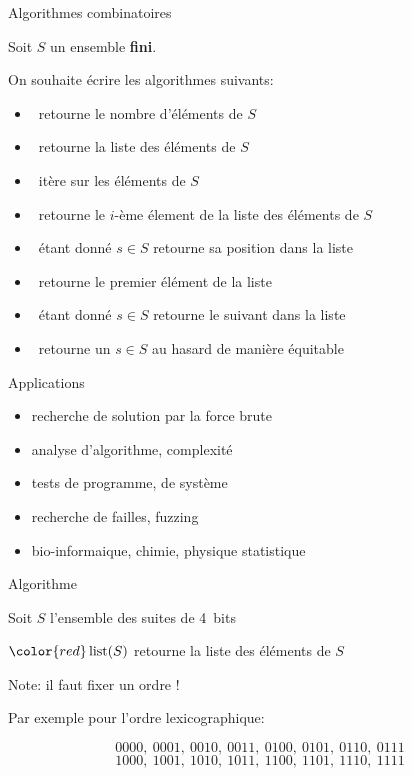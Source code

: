 \documentclass{beamer}
\def\red{\color{red}}
\begin{document}
\begin{frame}{Algorithmes combinatoires}

   Soit $S$ un ensemble \textbf{fini}.

   On souhaite écrire les algorithmes suivants: \bigskip

\begin{itemize}
\item \Count\ retourne le nombre d'éléments de $S$
\item \List\ retourne la liste des éléments de $S$
\item \Iter\ itère sur les éléments de $S$
\item \Unrank\ retourne le $i$-ème élement de la liste des éléments de $S$
\item \Rank\ étant donné $s\in S$ retourne sa position dans la liste
\item \First\ retourne le premier élément de la liste
\item \Next\ étant donné $s\in S$ retourne le suivant dans la liste
\item \Random\ retourne un $s\in S$ au hasard de manière équitable
\end{itemize}
\end{frame}

\begin{frame}{Applications}

  \begin{itemize}
  \item recherche de solution par la force brute
    \bigskip

  \item analyse d'algorithme, complexité
    \bigskip

  \item tests de programme, de système
    \bigskip

  \item recherche de failles, fuzzing
    \bigskip

  \item bio-informaique, chimie, physique statistique
  \end{itemize}
\end{frame}

\begin{frame}{Algorithme \List}

Soit $S$ l'ensemble des suites de 4~bits
\medskip

\begin{ALGO}[{{\red\List}}]
${\red\List(S)}$ retourne la liste des éléments de $S$
\end{ALGO}
\medskip\pause

Note: il faut fixer un ordre !
\medskip\pause

Par exemple pour l'ordre lexicographique:

\[ 0000,\ 0001,\ 0010,\ 0011,\ 0100,\ 0101,\ 0110,\ 0111 \]
\[ 1000,\ 1001,\ 1010,\ 1011,\ 1100,\ 1101,\ 1110,\ 1111 \]
\end{frame}
\end{document}
